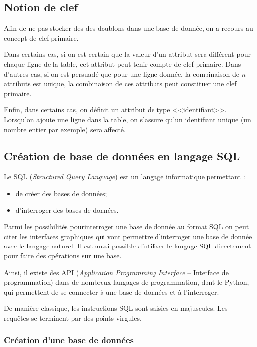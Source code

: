 \documentclass[10pt,fleqn]{article} %
\begin{document}
\subsection{Notion de clef}
Afin de ne pas stocker des des doublons dans une base de donnée, on a recours au concept de clef primaire. 

Dans certains cas, si on est certain que la valeur d'un attribut sera différent pour chaque ligne de la table, cet attribut peut tenir compte de clef primaire. Dans d'autres cas, si on est persuadé que pour une ligne donnée, la combinaison de $n$ attributs est unique, la combinaison de ces attributs peut constituer une clef primaire. 

Enfin, dans certains cas, on définit un attribut de type <<identifiant>>. Lorsqu'on ajoute une ligne dans la table, on s'assure qu'un identifiant unique (un nombre entier par exemple) sera affecté.

\subsection{Création de base de données en langage SQL}
Le SQL (\textit{Structured Query Language}) est un langage informatique permettant :
\begin{itemize}
\item de créer des bases de données;
\item d'interroger des bases de données.
\end{itemize}

Parmi les possibilités pourinterroger une base de donnée au format SQL on peut citer les interfaces graphiques qui vont permettre d'interroger une base de donnée avec le langage naturel. Il est aussi possible d'utiliser le langage SQL directement pour faire des opérations sur une base. 

\begin{exemple}
Ainsi, il existe des API (\textit{Application Programming Interface} -- Interface de programmation) dans de nombreux langages de programmation, dont le Python, qui permettent de se connecter à une base de données et à l'interroger. 

\end{exemple}

\begin{rem}
De manière classique, les instructions SQL sont saisies en majuscules. Les requêtes se terminent par des points-virgules.
\end{rem}

\subsubsection{Création d'une base de données}
\end{document}
